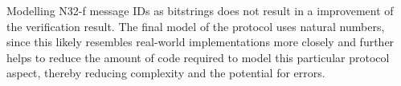 Modelling N32-f message IDs as bitstrings does not result in a improvement of the verification result.
The final model of the protocol uses natural numbers, since this likely resembles real-world implementations more closely and further helps to reduce the amount of code required to model this particular protocol aspect, thereby reducing complexity and the potential for errors.